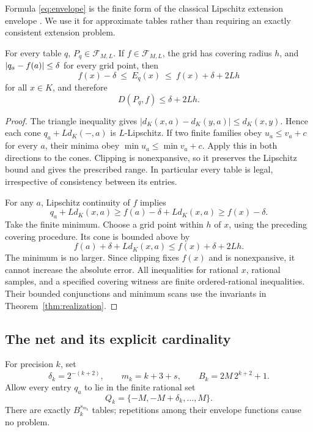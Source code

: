 Formula \eqref{eq:envelope} is the finite form of the classical Lipschitz extension envelope \cite{mcshane}. We use it for approximate tables rather than requiring an exactly consistent extension problem.

\begin{lemma}\label{lem:envelope}
For every table \(q\), \(P_q\in\mathcal F_{M,L}\). If \(f\in\mathcal F_{M,L}\), the grid has covering radius \(h\), and
\(\left|q_a-f(a)\right|\leq\delta\) for every grid point, then
\[
 f(x)-\delta\ \leq\ E_q(x)\ \leq\ f(x)+\delta+2Lh
\]
for all \(x\in K\), and therefore
\begin{equation}
 D(P_q,f)\leq\delta+2Lh.
 \label{eq:envelope-error}
\end{equation}
\end{lemma}

\begin{proof}
The triangle inequality gives
\(|d_K(x,a)-d_K(y,a)|\leq d_K(x,y)\). Hence each cone \(q_a+Ld_K(-,a)\) is \(L\)-Lipschitz. If two finite families obey \(u_a\leq v_a+c\) for every \(a\), their minima obey \(\min u_a\leq\min v_a+c\). Apply this in both directions to the cones. Clipping is nonexpansive, so it preserves the Lipschitz bound and gives the prescribed range. In particular every table is legal, irrespective of consistency between its entries.

For any \(a\), Lipschitz continuity of \(f\) implies
\[
 q_a+Ld_K(x,a)\geq f(a)-\delta+Ld_K(x,a)\geq f(x)-\delta.
\]
Take the finite minimum. Choose a grid point within \(h\) of \(x\), using the preceding covering procedure. Its cone is bounded above by
\[
 f(a)+\delta+Ld_K(x,a)\leq f(x)+\delta+2Lh.
\]
The minimum is no larger. Since clipping fixes \(f(x)\) and is nonexpansive, it cannot increase the absolute error. All inequalities for rational \(x\), rational samples, and a specified covering witness are finite ordered-rational inequalities. Their bounded conjunctions and minimum scans use the invariants in Theorem~\ref{thm:realization}.
\end{proof}

\subsection{The net and its explicit cardinality}

For precision \(k\), set
\[
 \delta_k=2^{-(k+2)},\qquad m_k=k+3+s,
 \qquad B_k=2M\,2^{k+2}+1.
\]
Allow every entry \(q_a\) to lie in the finite rational set
\[
 Q_k=\{-M,-M+\delta_k,\ldots,M\}.
\]
There are exactly \(B_k^{s_{m_k}}\) tables; repetitions among their envelope functions cause no problem.

